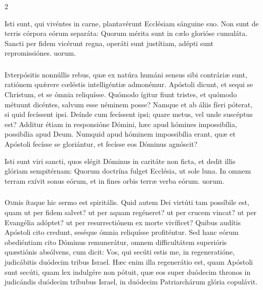 \documentclass[9pt,twoside]{extarticle}
\begin{document}
\begin{multicols}{2}
\begin{tightlist}{}
\item {} Isti sunt, qui vivéntes in carne, plantavérunt Ecclésiam sánguine suo. Non sunt de terris córpora eórum separáta: \textred{*} Quorum mérita sunt in cælo glorióse cumuláta.  Sancti per fidem vicérunt regna, operáti sunt justítiam, adépti sunt repromissiónes. uorum.
\end{tightlist}

\subsubsection*{\center {}}
\lettrine{I}nterpósitis nonnúllis rebus, quæ ex natúra humáni sensus sibi contráriæ sunt, ratiónem quǽrere cœléstis intelligéntiæ admonémur. Apóstoli dicunt, et sequi se Christum, et se ómnia reliquísse. Quómodo ígitur fiunt tristes, et quómodo métuunt dicéntes, salvum esse néminem posse? Namque et ab áliis fíeri póterat, si quid fecíssent ipsi. Deínde cum fecíssent ipsi; quare metus, vel unde suscéptus est? Additur étiam in responsióne Dómini, hæc apud hómines impossibília, possibília apud Deum. Numquid apud hóminem impossibília erant, quæ et Apóstoli fecísse se gloriántur, et fecísse eos Dóminus agnóscit?

\begin{tightlist}{}
\item {} Isti sunt viri sancti, quos elégit Dóminus in caritáte non ficta, et dedit illis glóriam sempitérnam: \textred{*} Quorum doctrína fulget Ecclésia, ut sole luna.  In omnem terram exívit sonus eórum, et in fines orbis terræ verba eórum. uorum.
\end{tightlist}

\subsubsection*{\center {}}
\lettrine{O}mnis ítaque hic sermo est spiritális. Quid autem Dei virtúti tam possíbile est, quam ut per fidem salvet? ut per aquam regéneret? ut per crucem vincat? ut per Evangélia adóptet? ut per resurrectiónem ex morte vivíficet? Quibus audítis Apóstoli cito credunt, seséque ómnia reliquísse profiténtur. Sed hanc eórum obediéntiam cito Dóminus remunerátur, omnem difficultátem superióris quæstiónis absólvens, cum dicit: Vos, qui secúti estis me, in regeneratióne, judicábitis duódecim tribus Israel. Hæc enim illa regenerátio est, quam Apóstoli sunt secúti, quam lex indulgére non pótuit, quæ eos super duódecim thronos in judicándis duódecim tríbubus Israel, in duódecim Patriarchárum glória copulávit.


\end{multicols}
\end{document}
